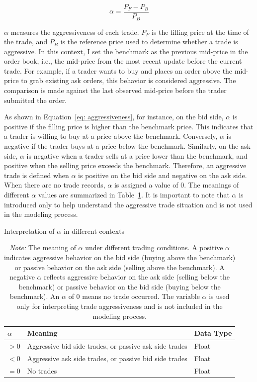 \begin{equation}
    \alpha = \frac{P_F - P_B}{P_B}
    \label{eq: aggressiveness}
\end{equation}

$\alpha$ measures the aggressiveness of each trade. $P_F$ is the filling price at the time of the trade, and $P_B$ is the reference price used to determine whether a trade is aggressive. In this context, I set the benchmark as the previous mid-price in the order book, i.e., the mid-price from the most recent update before the current trade. For example, if a trader wants to buy and places an order above the mid-price to grab existing ask orders, this behavior is considered aggressive. The comparison is made against the last observed mid-price before the trader submitted the order. 

As shown in Equation~\ref{eq: aggressiveness}, for instance, on the bid side, $\alpha$ is positive if the filling price is higher than the benchmark price. This indicates that a trader is willing to buy at a price above the benchmark. Conversely, $\alpha$ is negative if the trader buys at a price below the benchmark. Similarly, on the ask side, $\alpha$ is negative when a trader sells at a price lower than the benchmark, and positive when the selling price exceeds the benchmark. Therefore, an aggressive trade is defined when $\alpha$ is positive on the bid side and negative on the ask side. When there are no trade records, $\alpha$ is assigned a value of 0. The meanings of different $\alpha$ values are summarized in Table~\ref{tb: alpha_meaning}. It is important to note that $\alpha$ is introduced only to help understand the aggressive trade situation and is not used in the modeling process. 

\begin{table}[tbp] 
    \centering 
    \caption{Interpretation of $\alpha$ in different contexts}
    \caption*{\textit{Note:} The meaning of $\alpha$ under different trading conditions. A positive $\alpha$ indicates aggressive behavior on the bid side (buying above the benchmark) or passive behavior on the ask side (selling above the benchmark). A negative $\alpha$ reflects aggressive behavior on the ask side (selling below the benchmark) or passive behavior on the bid side (buying below the benchmark). An $\alpha$ of 0 means no trade occurred. The variable $\alpha$ is used only for interpreting trade aggressiveness and is not included in the modeling process.}
    \begin{tabular}{lll} 
        \toprule 
        \textbf{$\alpha$} & \textbf{Meaning} & \textbf{Data Type} \\ 
        \midrule 
        $ > 0$ & Aggressive bid side trades, or passive ask side trades & Float \\
        $ < 0$ & Aggressive ask side trades, or passive bid side trades & Float \\ 
        $ = 0$ & No trades & Float \\  
        \bottomrule 
    \end{tabular} 
    \label{tb: alpha_meaning}
\end{table}

